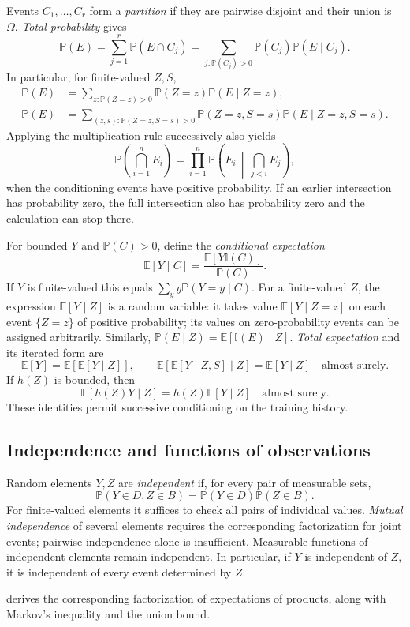 \documentclass[11pt,twoside]{article}
\newcommand{\I}{\mathbb I}
\renewcommand{\P}{\mathbb P}
\theoremstyle{definition}
\theoremstyle{remark}
\begin{document}
Events $C_1,\ldots,C_r$ form a \emph{partition} if they are pairwise disjoint
and their union is $\Omega$. \emph{Total probability} gives
\[
\P(E)=\sum_{j=1}^r\P(E\cap C_j)
=\sum_{j:\P(C_j)>0}\P(C_j)\P(E\mid C_j).
\]
In particular, for finite-valued $Z,S$,
\begin{align*}
\P(E)&=\sum_{z:\P(Z=z)>0}\P(Z=z)\P(E\mid Z=z),\\
\P(E)&=\sum_{(z,s):\P(Z=z,S=s)>0}
\P(Z=z,S=s)\P(E\mid Z=z,S=s).
\end{align*}
Applying the multiplication rule successively also yields
\[
\P\left(\bigcap_{i=1}^n E_i\right)
=\prod_{i=1}^n\P\left(E_i\,\middle|\,\bigcap_{j<i}E_j\right),
\]
when the conditioning events have positive probability. If an earlier
intersection has probability zero, the full intersection also has probability
zero and the calculation can stop there.

For bounded $Y$ and $\P(C)>0$, define the \emph{conditional expectation}
\[
\mathbb E[Y\mid C]=\frac{\mathbb E[Y\I(C)]}{\P(C)}.
\]
If $Y$ is finite-valued this equals $\sum_y y\P(Y=y\mid C)$.
For a finite-valued $Z$, the expression $\mathbb E[Y\mid Z]$ is a random
variable: it takes value $\mathbb E[Y\mid Z=z]$ on each event $\{Z=z\}$
of positive probability; its values on zero-probability events can be assigned
arbitrarily.
Similarly, $\P(E\mid Z)=\mathbb E[\I(E)\mid Z]$.
\emph{Total expectation} and its iterated form are
\[
\mathbb E[Y]=\mathbb E[\mathbb E[Y\mid Z]],
\qquad
\mathbb E[\mathbb E[Y\mid Z,S]\mid Z]=\mathbb E[Y\mid Z]
\quad\text{almost surely}.
\]
If $h(Z)$ is bounded, then
\[
\mathbb E[h(Z)Y\mid Z]=h(Z)\mathbb E[Y\mid Z]
\quad\text{almost surely}.
\]
These identities permit successive conditioning on the training history.

\subsection{Independence and functions of observations}
Random elements $Y,Z$ are \emph{independent} if, for every pair of measurable sets,
\[
\P(Y\in D,Z\in B)=\P(Y\in D)\P(Z\in B).
\]
For finite-valued elements it suffices to check all pairs of individual
values. \emph{Mutual independence} of several elements requires the corresponding
factorization for joint events; pairwise independence alone is insufficient.
Measurable functions of independent elements remain independent. In
particular, if $Y$ is independent of $Z$, it is independent of every event
determined by $Z$.

 derives the corresponding factorization
of expectations of products, along with Markov's inequality and the
union bound.
\end{document}
